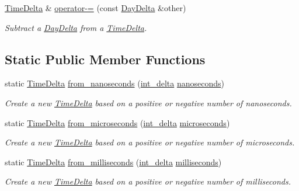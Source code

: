 \begin{DoxyCompactItemize}
\hyperlink{structTimeDelta}{Time\-Delta} \& \hyperlink{structTimeDelta_a8a8d2796e13a24266d46c54873d57eb2}{operator-\/=} (const \hyperlink{structDayDelta}{Day\-Delta} \&other)
\begin{DoxyCompactList}\small\item\em Subtract a \hyperlink{structDayDelta}{Day\-Delta} from a \hyperlink{structTimeDelta}{Time\-Delta}. \end{DoxyCompactList}\end{DoxyCompactItemize}
\subsection*{Static Public Member Functions}
\begin{DoxyCompactItemize}
\item 
static \hyperlink{structTimeDelta}{Time\-Delta} \hyperlink{structTimeDelta_abc1b517c2156b2d9627fd07d42aecb2f}{from\-\_\-nanoseconds} (\hyperlink{types_8h_a8a67cf99971c5cfeeaa2380ba84a4c92}{int\-\_\-delta} \hyperlink{structTimeDelta_a27608357ea9addd1d0da20918f91d500}{nanoseconds})
\begin{DoxyCompactList}\small\item\em Create a new \hyperlink{structTimeDelta}{Time\-Delta} based on a positive or negative number of nanoseconds. \end{DoxyCompactList}\item 
static \hyperlink{structTimeDelta}{Time\-Delta} \hyperlink{structTimeDelta_a32f3fa21ba37d81507383d001f3b704b}{from\-\_\-microseconds} (\hyperlink{types_8h_a8a67cf99971c5cfeeaa2380ba84a4c92}{int\-\_\-delta} \hyperlink{structTimeDelta_aa23b22a3b2a0f3f559e9dc343588b546}{microseconds})
\begin{DoxyCompactList}\small\item\em Create a new \hyperlink{structTimeDelta}{Time\-Delta} based on a positive or negative number of microseconds. \end{DoxyCompactList}\item 
static \hyperlink{structTimeDelta}{Time\-Delta} \hyperlink{structTimeDelta_a01e0919f444379030aa37559fa13542c}{from\-\_\-milliseconds} (\hyperlink{types_8h_a8a67cf99971c5cfeeaa2380ba84a4c92}{int\-\_\-delta} \hyperlink{structTimeDelta_a185b2278844ed43b2f5e1e8d16b11cb2}{milliseconds})
\begin{DoxyCompactList}\small\item\em Create a new \hyperlink{structTimeDelta}{Time\-Delta} based on a positive or negative number of milliseconds. \end{DoxyCompactList}\item 

\end{DoxyCompactItemize}
